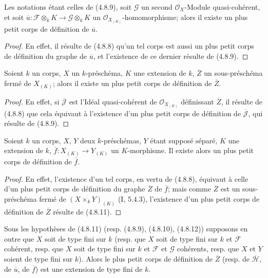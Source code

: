 \begin{corollary}[4.8.10]
\label{IV.2.4.8.10-fr}
Les notations étant celles de (4.8.9), soit $\mathscr G$ un second
$\mathcal O_X$-Module quasi-cohérent, et soit
$\overline u:\mathscr F\otimes_kK\to\mathscr G\otimes_kK$ un
$\mathcal O_{X_{(K)}}$-homomorphisme; alors il existe un plus petit corps de
définition de $\overline u$.
\end{corollary}


\begin{proof}
En effet, il résulte de (4.8.8) qu'un tel corps est aussi un plus petit corps
de définition du graphe de $\overline u$, et l'existence de ce dernier résulte
de (4.8.9).
\end{proof}

\begin{corollary}[4.8.11]
\label{IV.2.4.8.11-fr}
Soient $k$ un corps, $X$ un $k$-préschéma, $K$ une extension de $k$,
$\overline Z$ un sous-préschéma fermé de $X_{(K)}$; alors il existe un plus
petit corps de définition de $\overline Z$.
\end{corollary}

\begin{proof}
En effet, si $\overline{\mathscr J}$ est l'Idéal quasi-cohérent de
$\mathcal O_{X_{(K)}}$ définissant $\overline Z$, il résulte de (4.8.8) que
cela équivaut à l'existence d'un plus petit corps de définition de
$\overline{\mathscr J}$, qui résulte de (4.8.9).
\end{proof}

\begin{corollary}[4.8.12]
\label{IV.2.4.8.12-fr}
Soient $k$ un corps, $X$, $Y$ deux $k$-préschémas, $Y$ étant supposé séparé,
$K$ une extension de $k$, $\overline f:X_{(K)}\to Y_{(K)}$ un $K$-morphisme.
Il existe alors un plus petit corps de définition de $\overline f$.
\end{corollary}

\begin{proof}
En effet, l'existence d'un tel corps, en vertu de (4.8.8), équivaut à celle
d'un plus petit corps de définition du graphe $\overline Z$ de $\overline f$;
mais comme $\overline Z$ est un sous-préschéma fermé de
$(X\times_kY)_{(K)}$ (I, 5.4.3), l'existence d'un plus petit corps de
définition de $\overline Z$ résulte de (4.8.11).
\end{proof}

\begin{proposition}[4.8.13]
\label{IV.2.4.8.13-fr}
Sous les hypothèses de (4.8.11) (resp. (4.8.9), (4.8.10), (4.8.12))
supposons en outre que $X$ soit de type fini sur $k$ (resp. que $X$ soit de
type fini sur $k$ et $\mathscr F$ cohérent, resp. que $X$ soit de type fini
sur $k$ et $\mathscr F$ et $\mathscr G$ cohérents, resp. que $X$ et $Y$
soient de type fini sur $k$). Alors le plus petit corps de définition de
$\overline Z$ (resp. de $\overline{\mathscr H}$, de $\overline u$, de $\overline f$) est
une extension de type fini de $k$.
\end{proposition}

